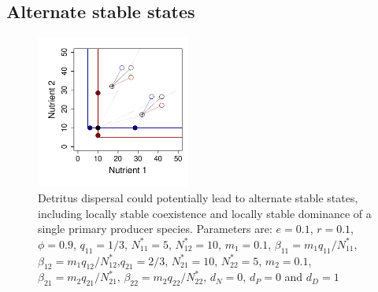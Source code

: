 \documentclass[letterpaper,twocolumn,showkeys]{revtex4-1}
\begin{document}
\subsection{Alternate stable states}

\begin{figure}[tb]
   \centering
   \includegraphics[width=0.45\textwidth]{AlternateStates.pdf}
   \caption{Detritus dispersal could potentially lead to alternate stable states, including locally stable coexistence and locally stable dominance of a single primary producer species. Parameters are: $e=0.1$, $r= 0.1$, $\phi=0.9$, $q_{11} = 1/3$, $N^*_{11}=5$, $N^*_{12}=10$, $m_1 =0.1$, $\beta_{11} = m_1q_{11}/N^*_{11}$, $\beta_{12} = m_1q_{12}/N^*_{12}$,$q_{21} = 2/3$, $N^*_{21}=10$, $N^*_{22}=5$, $m_2 =0.1$,$\beta_{21} = m_2q_{21}/N^*_{21}$, $\beta_{22} = m_2q_{22}/N^*_{22}$, $d_N = 0$, $d_P = 0$ and $d_D = 1$}
   \label{f:ASS}
\end{figure}
\end{document}

